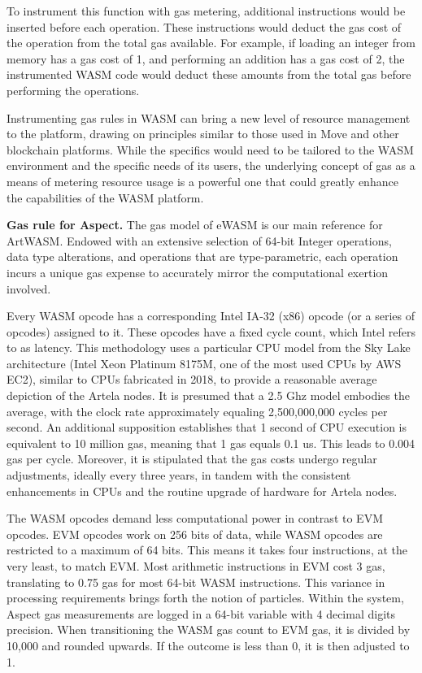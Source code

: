 To instrument this function with gas metering, additional instructions would be inserted before each operation. These instructions would deduct the gas cost of the operation from the total gas available. For example, if loading an integer from memory has a gas cost of 1, and performing an addition has a gas cost of 2, the instrumented WASM code would deduct these amounts from the total gas before performing the operations.

Instrumenting gas rules in WASM can bring a new level of resource management to the platform, drawing on principles similar to those used in Move and other blockchain platforms. While the specifics would need to be tailored to the WASM environment and the specific needs of its users, the underlying concept of gas as a means of metering resource usage is a powerful one that could greatly enhance the capabilities of the WASM platform.

\textbf{Gas rule for Aspect.} The gas model of eWASM is our main reference for ArtWASM. Endowed with an extensive selection of 64-bit Integer operations, data type alterations, and operations that are type-parametric, each operation incurs a unique gas expense to accurately mirror the computational exertion involved.

Every WASM opcode has a corresponding Intel IA-32 (x86) opcode (or a series of opcodes) assigned to it. These opcodes have a fixed cycle count, which Intel refers to as latency. This methodology uses a particular CPU model from the Sky Lake architecture (Intel Xeon Platinum 8175M, one of the most used CPUs by AWS EC2), similar to CPUs fabricated in 2018, to provide a reasonable average depiction of the Artela nodes. It is presumed that a 2.5 Ghz model embodies the average, with the clock rate approximately equaling 2,500,000,000 cycles per second. An additional supposition establishes that 1 second of CPU execution is equivalent to 10 million gas, meaning that 1 gas equals 0.1 us. This leads to 0.004 gas per cycle. Moreover, it is stipulated that the gas costs undergo regular adjustments, ideally every three years, in tandem with the consistent enhancements in CPUs and the routine upgrade of hardware for Artela nodes.

The WASM opcodes demand less computational power in contrast to EVM opcodes. EVM opcodes work on 256 bits of data, while WASM opcodes are restricted to a maximum of 64 bits. This means it takes four instructions, at the very least, to match EVM. Most arithmetic instructions in EVM cost 3 gas, translating to 0.75 gas for most 64-bit WASM instructions. This variance in processing requirements brings forth the notion of particles. Within the system, Aspect gas measurements are logged in a 64-bit variable with 4 decimal digits precision. When transitioning the WASM gas count to EVM gas, it is divided by 10,000 and rounded upwards. If the outcome is less than 0, it is then adjusted to 1.

